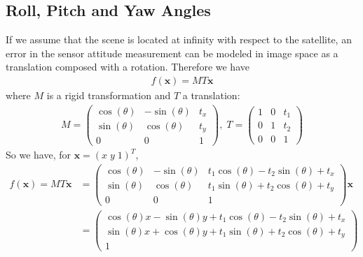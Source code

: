 \documentclass[paper=a4, fontsize=11pt]{article}
\begin{document}




\subsection{Roll, Pitch and Yaw Angles}
If we assume that the scene is located at infinity with respect to the satellite, an error in the sensor attitude measurement can be modeled in image space as a translation composed with a rotation. Therefore we have
\begin{align*}
f(\textbf{x}) = MT\textbf{x}
\end{align*}
where $M$ is a rigid transformation and $T$ a translation:\\
\begin{align*} 
M = 
\begin{pmatrix} 
\cos(\theta) & -\sin(\theta) & t_x \\
\sin(\theta) & \cos(\theta) & t_y \\
0 & 0 & 1
\end{pmatrix}, \; 
T = 
\begin{pmatrix} 
1 & 0 & t_1 \\
0 & 1 & t_2 \\
0 & 0 & 1
\end{pmatrix}
\end{align*}
So we have, for $ \textbf{x} = (  x \; y \; 1)^T $, 
\begin{align*}
f(\textbf{x}) = MT\textbf{x} &= 
\begin{pmatrix} 
\cos(\theta) & -\sin(\theta) & t_1\cos(\theta) - t_2\sin(\theta) + t_x \\
\sin(\theta) & \cos(\theta) & t_1\sin(\theta) + t_2\cos(\theta) + t_y \\
0 & 0 & 1
\end{pmatrix} \textbf{x}  \\
&= 
\begin{pmatrix} 
\cos(\theta)x -\sin(\theta)y + t_1\cos(\theta) - t_2\sin(\theta) + t_x \\
\sin(\theta)x + \cos(\theta)y + t_1\sin(\theta) + t_2\cos(\theta) + t_y \\
1
\end{pmatrix}
\end{align*}
\end{document}
